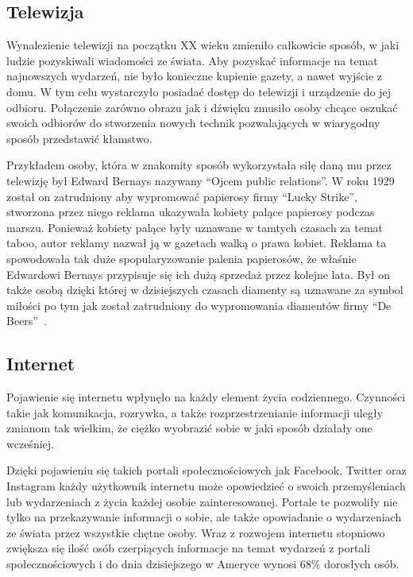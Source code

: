 \subsection{Telewizja}
Wynalezienie telewizji na początku XX wieku zmieniło całkowicie sposób, w jaki ludzie pozyskiwali wiadomości ze świata.
Aby pozyskać informacje na temat najnowszych wydarzeń, nie było konieczne kupienie gazety, a nawet 
wyjście z domu. W tym celu wystarczyło posiadać dostęp do telewizji i urządzenie do jej odbioru. Połączenie zarówno obrazu
jak i dźwięku zmusiło osoby chcące oszukać swoich odbiorów do stworzenia nowych technik 
pozwalających w wiarygodny sposób przedstawić kłamstwo.

Przykładem osoby, która w znakomity sposób wykorzystała siłę daną mu przez telewizję był Edward Bernays
nazywany ``Ojcem public relations''.
W roku 1929 został on zatrudniony aby wypromować papierosy firmy ``Lucky Strike'',
stworzona przez niego reklama ukazywała kobiety palące papierosy podczas marszu. 
Ponieważ kobiety palące były uznawane w tamtych czasach za temat
taboo, autor reklamy nazwał ją w gazetach walką o prawa kobiet. Reklama ta spowodowała tak duże 
spopularyzowanie palenia papierosów, że właśnie Edwardowi Bernays przypisuje się
ich dużą sprzedaż przez kolejne lata.
Był on także osobą dzięki której w dzisiejszych czasach diamenty są uznawane za symbol miłości po tym jak
został zatrudniony do wypromowania diamentów firmy ``De Beers''~\cite{MarkDice}.

\subsection{Internet}
Pojawienie się internetu wpłynęło na każdy element życia codziennego. Czynności takie jak komunikacja, rozrywka,
a także rozprzestrzenianie informacji uległy zmianom tak wielkim, że ciężko wyobrazić sobie w jaki sposób działały
one wcześniej. 

Dzięki pojawieniu się takich portali społecznościowych jak Facebook, Twitter oraz Instagram każdy użytkownik
internetu może opowiedzieć o swoich przemyśleniach lub wydarzeniach z życia każdej osobie zainteresowanej. Portale te
pozwoliły nie tylko na przekazywanie informacji o sobie, ale także opowiadanie o wydarzeniach ze świata przez wszystkie
chętne osoby. Wraz z rozwojem internetu stopniowo zwiększa się ilość osób czerpiących informacje na temat wydarzeń
z portali społecznościowych i do dnia dzisiejszego w Ameryce wynosi 68\% dorosłych osób. 

